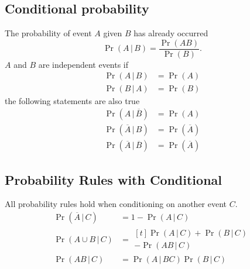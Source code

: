 \documentclass{article}
\begin{document}
\begin{multicols}{3}
    \subsection{Conditional probability}
    The probability of event \(A\) given \(B\) has already occurred
    \begin{equation*}
        \Pr{\left( A \,\vert\, B \right)} = \frac{\Pr{\left( A B \right)}}{\Pr{\left( B \right)}}.
    \end{equation*}
    \(A\) and \(B\) are independent events if
    \begin{align*}
        \Pr{\left( A \,\vert\, B \right)} & = \Pr{\left( A \right)} \\
        \Pr{\left( B \,\vert\, A \right)} & = \Pr{\left( B \right)}
    \end{align*}
    the following statements are also true
    \begin{align*}
        \Pr{\left( A \,\vert\, \overline{B} \right)}            & = \Pr{\left( A \right)}            \\
        \Pr{\left( \overline{A} \,\vert\, B \right)}            & = \Pr{\left( \overline{A} \right)} \\
        \Pr{\left( \overline{A} \,\vert\, \overline{B} \right)} & = \Pr{\left( \overline{A} \right)}
    \end{align*}
    \subsection{Probability Rules with Conditional}
    All probability rules hold when conditioning on another event \(C\).
    \begin{align*}
        \Pr{\left( \overline{A} \,\vert\, C \right)} & = 1 - \Pr{\left( A \,\vert\, C \right)}                                 \\
        \Pr{\left( A \cup B \,\vert\, C \right)}     & = \begin{aligned}[t]
                                                             \Pr{\left( A \,\vert\, C \right)} + \Pr{\left( B \,\vert\, C \right)} \\
                                                             - \Pr{\left( AB \,\vert\, C \right)}
                                                         \end{aligned} \\
        \Pr{\left( A B \,\vert\, C \right)}          & = \Pr{\left( A \,\vert\, BC \right)} \Pr{\left( B \,\vert\, C \right)}
    \end{align*}

\end{multicols}
\end{document}
